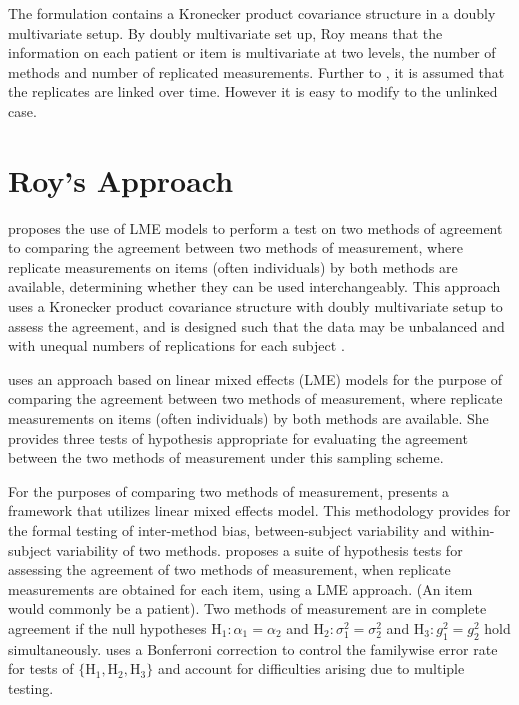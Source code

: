 \documentclass[12pt, a4paper]{report}
\theoremstyle{plain}
\theoremstyle{definition}
\theoremstyle{remark}
\begin{document}

The formulation contains a Kronecker product covariance structure in a doubly multivariate setup. By doubly multivariate set up, Roy means that the information on each patient or item is multivariate at two levels, the number of methods and number of replicated measurements. Further to \citet{lam}, it is assumed that the replicates are linked over time. However it is easy to modify to the unlinked case.



\section{Roy's Approach}
\citet{ARoy2009} proposes the use of LME models to perform a test on two methods of agreement to comparing the agreement between two methods of measurement, where replicate measurements on items (often individuals) by both methods are available, determining whether they can be used
interchangeably. This approach uses a Kronecker product covariance structure with doubly multivariate setup to
assess the agreement, and is designed such that the data may be unbalanced and with unequal numbers of replications for each subject \citep{ARoy2009}.

\citet{ARoy2009} uses an approach based on linear mixed effects (LME) models for the purpose of comparing the agreement between two methods of measurement, where replicate measurements on items (often individuals) by both methods are available. She provides three tests of hypothesis appropriate for evaluating the agreement between the two methods of measurement under this sampling scheme. 

For the purposes of comparing two methods of measurement, \citet{ARoy2009} presents a framework that utilizes linear mixed effects model. This methodology provides for the formal testing of inter-method bias, between-subject variability and within-subject variability of two methods. \citet{ARoy2009} proposes a suite of hypothesis tests for assessing the agreement of two methods of measurement, when replicate measurements are obtained for each item, using a LME approach. (An item would commonly be a patient).  
Two methods of measurement are in complete agreement if the null hypotheses $\mathrm{H}_1\colon \alpha_1 = \alpha_2$ and $\mathrm{H}_2\colon \sigma^2_1 = \sigma^2_2 $ and $\mathrm{H}_3\colon g^2_1= g^2_2$ hold simultaneously. \citet{ARoy2009} uses a Bonferroni correction to control the familywise error rate for tests of $\{\mathrm{H}_1, \mathrm{H}_2, \mathrm{H}_3\}$ and account for difficulties arising due to multiple testing. 
\end{document}
